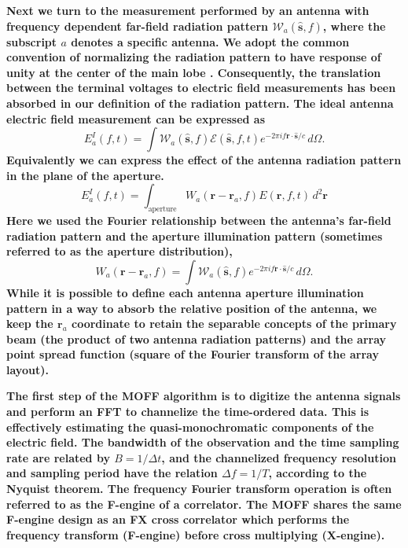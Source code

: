 \documentclass[a4paper,fleqn,usenatbib]{../mnras}
\begin{document}
\textbf{Next we turn to the measurement performed by an antenna with frequency dependent far-field radiation pattern 
$\mathcal{W}_a(\hat{\mathbf{s}},f)$, where the subscript $a$ denotes a specific antenna. We 
adopt the common convention of normalizing the radiation pattern to have response of unity at the 
center of the main lobe \citep[e.g.][]{nap99}. Consequently, the translation between the terminal 
voltages to electric field measurements has been absorbed in our definition of the radiation 
pattern. The ideal antenna electric field measurement can be expressed as 
\begin{equation}
E^I_a(f,t) = \int \mathcal{W}_a(\hat{\mathbf{s}},f)\mathcal{E}(\hat{\mathbf{s}},f,t) e^{-2\pi i f\mathbf{r} \cdot \hat{\mathbf{s}}/c}\, d\Omega. 
\end{equation}
Equivalently we can express the effect of the antenna radiation pattern in the plane of the 
aperture.
\begin{equation}
E^I_a(f,t) = \int_{\mathrm{aperture}}W_a(\mathbf{r}-\mathbf{r}_a,f)E(\mathbf{r},f,t)\,d^2\mathbf{r}
\end{equation}
Here we used the Fourier relationship between the antenna's far-field radiation pattern and the 
aperture illumination pattern (sometimes referred to as the aperture distribution), 
\begin{equation}
W_a(\mathbf{r}-\mathbf{r}_a,f)=\int  \mathcal{W}_a(\hat{\mathbf{s}},f) e^{-2\pi i f\mathbf{r} \cdot \hat{\mathbf{s}}/c}\, d
\Omega.
\end{equation} 
While it is possible to define each antenna aperture illumination pattern in a way to absorb the 
relative position of the antenna, we keep the $\mathbf{r}_a$ coordinate to retain the separable
concepts of the primary beam (the product of two antenna radiation patterns) and the array
point spread function (square of the Fourier transform of the array layout).}

\textbf{The first step of the MOFF algorithm is to digitize the antenna signals and perform an FFT to 
channelize the time-ordered data. This is effectively estimating the quasi-monochromatic 
components of the electric field. 
The bandwidth of the observation and the time sampling rate are related by $B=1/\Delta t$,
and the channelized frequency resolution and sampling period have the relation
$\Delta f = 1/T$, according to the Nyquist theorem.
The frequency Fourier transform operation is often referred to as 
the F-engine of a correlator. The MOFF shares the same F-engine design as an FX cross
correlator which performs the frequency transform (F-engine) before cross multiplying 
(X-engine). }
\end{document}
